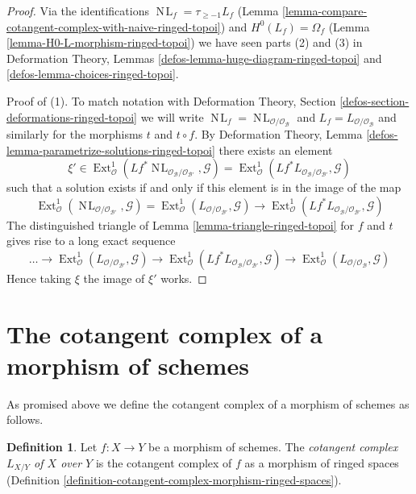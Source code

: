 \documentclass{stacks-project}
\theoremstyle{plain}
\theoremstyle{definition}
\newtheorem{definition}[subsection]{Definition}
\theoremstyle{remark}
\numberwithin{equation}{subsection}
\def\Ext{\mathop{\mathrm{Ext}}\nolimits}
\def\NL{\mathop{N\!L}\nolimits}
\begin{document}
\begin{proof}
Via the identifications $\NL_f = \tau_{\geq -1}L_f$
(Lemma \ref{lemma-compare-cotangent-complex-with-naive-ringed-topoi}) and
$H^0(L_f) = \Omega_f$
(Lemma \ref{lemma-H0-L-morphism-ringed-topoi})
we have seen parts (2) and (3) in
Deformation Theory, Lemmas \ref{defos-lemma-huge-diagram-ringed-topoi} and
\ref{defos-lemma-choices-ringed-topoi}.

\medskip\noindent
Proof of (1). To match notation with Deformation Theory, Section
\ref{defos-section-deformations-ringed-topoi} we will write
$\NL_f = \NL_{\mathcal{O}/\mathcal{O}_\mathcal{B}}$ and
$L_f = L_{\mathcal{O}/\mathcal{O}_\mathcal{B}}$ and similarly
for the morphisms $t$ and $t \circ f$. By
Deformation Theory, Lemma \ref{defos-lemma-parametrize-solutions-ringed-topoi}
there exists an element
$$
\xi' \in
\Ext^1_\mathcal{O}(
Lf^*\NL_{\mathcal{O}_\mathcal{B}/\mathcal{O}_{\mathcal{B}'}}, \mathcal{G}) =
\Ext^1_\mathcal{O}(
Lf^*L_{\mathcal{O}_\mathcal{B}/\mathcal{O}_{\mathcal{B}'}}, \mathcal{G})
$$
such that a solution exists if and only if this element is in
the image of the map
$$
\Ext^1_\mathcal{O}(
\NL_{\mathcal{O}/\mathcal{O}_{\mathcal{B}'}}, \mathcal{G}) =
\Ext^1_\mathcal{O}(
L_{\mathcal{O}/\mathcal{O}_{\mathcal{B}'}}, \mathcal{G})
\longrightarrow
\Ext^1_\mathcal{O}(
Lf^*L_{\mathcal{O}_\mathcal{B}/\mathcal{O}_{\mathcal{B}'}}, \mathcal{G})
$$
The distinguished triangle of Lemma \ref{lemma-triangle-ringed-topoi}
for $f$ and $t$ gives rise to a long exact sequence
$$
\ldots \to
\Ext^1_\mathcal{O}(
L_{\mathcal{O}/\mathcal{O}_{\mathcal{B}'}}, \mathcal{G}) \to
\Ext^1_\mathcal{O}(
Lf^*L_{\mathcal{O}_\mathcal{B}/\mathcal{O}_{\mathcal{B}'}}, \mathcal{G})
\to
\Ext^1_\mathcal{O}(
L_{\mathcal{O}/\mathcal{O}_\mathcal{B}}, \mathcal{G})
$$
Hence taking $\xi$ the image of $\xi'$ works.
\end{proof}












\section{The cotangent complex of a morphism of schemes}
\label{section-cotangent-morphism-schemes}

\noindent
As promised above we define the cotangent complex of a morphism of
schemes as follows.

\begin{definition}
\label{definition-cotangent-morphism-schemes}
Let $f : X \to Y$ be a morphism of schemes. The {\it cotangent complex
$L_{X/Y}$ of $X$ over $Y$} is the cotangent complex of $f$ as a
morphism of ringed spaces
(Definition \ref{definition-cotangent-complex-morphism-ringed-spaces}).
\end{definition}
\end{document}
